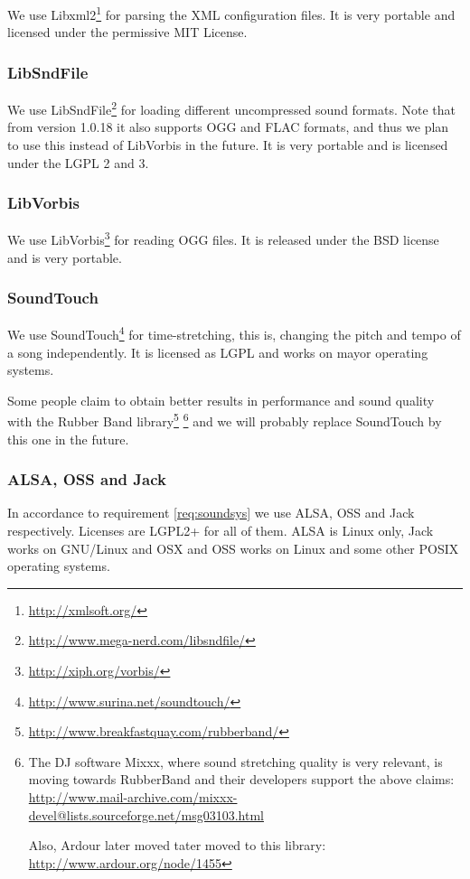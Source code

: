 We use Libxml2\footnote{\url{http://xmlsoft.org/}} for parsing the XML
configuration files. It is very portable and licensed under the
permissive MIT License.

\subsubsection{LibSndFile}

We use LibSndFile\footnote{\url{http://www.mega-nerd.com/libsndfile/}} for
loading different uncompressed sound formats. Note that from version
1.0.18 it also supports OGG and FLAC formats, and thus we plan to use
this instead of LibVorbis in the future. It is very portable and is
licensed under the LGPL 2 and 3.

\subsubsection{LibVorbis}

We use LibVorbis\footnote{\url{http://xiph.org/vorbis/}} for reading
OGG files. It is released under the BSD license and is very portable.

\subsubsection{SoundTouch}

We use SoundTouch\footnote{\url{http://www.surina.net/soundtouch/}}
for time-stretching, this is, changing the pitch and tempo of a song
independently. It is licensed as LGPL and works on mayor operating
systems.

Some people claim to obtain better results in performance and sound
quality with the Rubber Band
library\footnote{\url{http://www.breakfastquay.com/rubberband/}}
\footnote{The DJ software Mixxx, where sound stretching quality is
  very relevant, is moving towards RubberBand and their developers
  support the above claims:
  \url{http://www.mail-archive.com/mixxx-devel@lists.sourceforge.net/msg03103.html}

  Also, Ardour later moved tater moved to this library:
  \url{http://www.ardour.org/node/1455}} and we will probably replace
SoundTouch by this one in the future.

\subsubsection{ALSA, OSS and Jack}

In accordance to requirement \ref{req:soundsys} we use ALSA, OSS and
Jack respectively. Licenses are LGPL2+ for all of them. ALSA is Linux
only, Jack works on GNU/Linux and OSX and OSS works on Linux and some
other POSIX operating systems.

